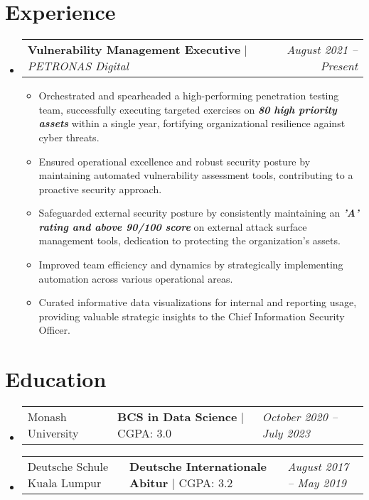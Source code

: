 \documentclass[letterpaper,10pt]{article}
\makeatletter
\newcommand{\subheadingtitlevspace}{
	\vspace{-3pt}
}
\newcommand{\resumeItem}[1]{
	\item{
		{#1 \vspace{-4pt}}
	}
}
\newcommand{\titleItem}[1]{
	\textbf{#1}
}
\newcommand{\highlight}[1]{
	\textsl{\textbf{#1}}
}
\newcommand{\resumeSubheading}[4]{
	\item
	\begin{tabular*}{0.97\textwidth}[t]{l@{\extracolsep{\fill}}l@{}l}     
		{#1} & \titleItem{#3} | {#2} & \textit{#4}\\
	\end{tabular*}\vspace{-10pt}
}
\newcommand{\resumeProjectHeading}[2]{
	\item
	\begin{tabular*}{0.97\textwidth}{l@{\extracolsep{\fill}}r}
		#1 & \textit{ #2} \\
	\end{tabular*}\vspace{-9pt}
}
\newcommand{\resumeSubHeadingListStart}{\subheadingtitlevspace\begin{itemize}[leftmargin=0.15in, label={}]}
\newcommand{\resumeSubHeadingListEnd}{\end{itemize}}
\newcommand{\resumeItemListStart}{
	\begin{itemize}}
\newcommand{\resumeItemListEnd}{
	\end{itemize}\vspace{-8pt}}
\makeatother
\begin{document}
	\section{Experience}
	\resumeSubHeadingListStart
	\resumeProjectHeading
	{\titleItem{{Vulnerability Management Executive}} $|$ \emph{PETRONAS Digital}}{August 2021 --Present}
	\resumeItemListStart
	\resumeItem{Orchestrated and spearheaded a high-performing penetration testing team, successfully executing targeted exercises on \highlight{80 high priority assets} within a single year, fortifying organizational resilience against cyber threats.}
	\resumeItem{Ensured operational excellence and robust security posture by maintaining automated vulnerability assessment tools, contributing to a proactive security approach.}
	\resumeItem{Safeguarded external security posture by consistently maintaining an \highlight{'A' rating and above 90/100 score} on external attack surface management tools, dedication to protecting the organization's assets.}
	\resumeItem{Improved team efficiency and dynamics by strategically implementing automation across various operational areas.}
	\resumeItem{Curated informative data visualizations for internal and reporting usage, providing valuable strategic insights to the Chief Information Security Officer.}
	\resumeItemListEnd
	
	
	\resumeSubHeadingListEnd
	
	
	
	\section{Education}
	\resumeSubHeadingListStart
	\resumeSubheading
	{Monash University}{CGPA: 3.0}
	{BCS in Data Science}{October 2020 -- July 2023} 
	\resumeSubheading
	{Deutsche Schule Kuala Lumpur}{CGPA: 3.2}
	{Deutsche Internationale Abitur}{August 2017  -- May 2019}
	\resumeSubHeadingListEnd
	\vspace{-8pt}
	
\end{document}
